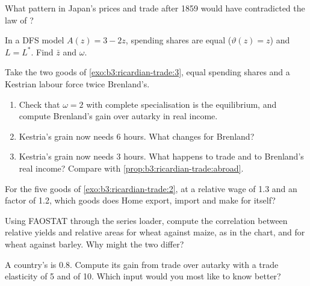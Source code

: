 \begin{exercise}[$\star$]\label{exo:b3:ricardian-trade:4}
What pattern in Japan's prices and trade after 1859 would have contradicted the
law of ?
\end{exercise}

\begin{exercise}[$\star\star$]\label{exo:b3:ricardian-trade:5}
In a DFS model $A(z) = 3 - 2z$, spending shares are equal ($\vartheta(z) = z$) and
$L = L^*$. Find $\bar z$ and $\omega$.
\end{exercise}

\begin{exercise}[$\star\star$]\label{exo:b3:ricardian-trade:6}
Take the two goods of \cref{exo:b3:ricardian-trade:3}, equal spending shares and
a Kestrian labour force twice Brenland's.
\begin{enumerate}
\item Check that $\omega = 2$ with complete specialisation is the equilibrium, and
compute Brenland's gain over autarky in real income.
\item Kestria's grain now needs 6 hours. What changes for Brenland?
\item Kestria's grain now needs 3 hours. What happens to trade and to Brenland's
real income? Compare with \cref{prop:b3:ricardian-trade:abroad}.
\end{enumerate}
\end{exercise}

\begin{exercise}[$\star\star$]\label{exo:b3:ricardian-trade:7}
For the five goods of \cref{exo:b3:ricardian-trade:2}, at a relative wage of 1.3
and an  factor of 1.2, which goods does Home export, import and make for
itself?
\end{exercise}

\begin{exercise}[$\star\star$]\label{exo:b3:ricardian-trade:8}
Using FAOSTAT through the series loader, compute the correlation between
relative yields and relative areas for wheat against maize, as in the chart,
and for wheat against barley. Why might the two differ?
\end{exercise}

\begin{exercise}[$\star\star$]\label{exo:b3:ricardian-trade:9}
A country's  is 0.8. Compute its gain from trade over
autarky with a trade elasticity of 5 and of 10. Which input would you most like
to know better?
\end{exercise}

